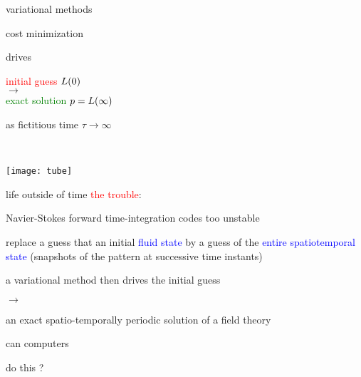 \begin{frame}{variational methods}
\bigskip

cost minimization

\bigskip

\begin{center}
\begin{minipage}[c]{0.55\textwidth}
\begin{center}
\bigskip

drives

\bigskip

	\vskip 1.0cm

\textcolor{red}{initial guess $L(0)$}
\\$\to$\\
\textcolor{green}{exact solution $p = L(\infty)$}

	\vskip 1.0cm

as fictitious time $\tau \to \infty$
\end{center}
\end{minipage}%
~~~~~~~\begin{minipage}[c]{0.40\textwidth}
	\begin{center}
	\texttt{[image: tube]}
	\end{center}
\end{minipage}
\end{center}
\end{frame}

\begin{frame}{life outside of time}
\textcolor{red}{the trouble}:

Navier-Stokes forward time-integration codes too unstable

\bigskip
\bigskip

 replace a guess that an initial  \textcolor{blue}{fluid state}
 by a guess of the \textcolor{blue}{entire spatiotemporal state}
 (snapshots of the pattern at successive time instants)%


\bigskip

a variational method
then drives the initial guess

\bigskip

$\to$

\bigskip

an exact spatio-temporally periodic solution of a field theory
\end{frame}

\begin{frame}{can computers}

\vfill

{\Huge
do this ?
                  }

\vfill

\end{frame}


